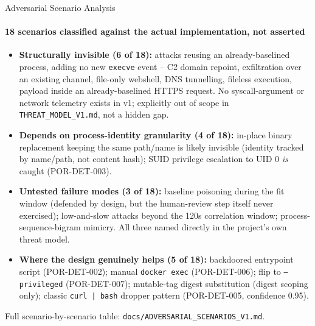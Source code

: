 \documentclass[aspectratio=169, 11pt]{beamer}
\begin{document}
\begin{frame}{Adversarial Scenario Analysis}
\framesubtitle{18 scenarios classified against the actual implementation, not asserted}
\scriptsize
\begin{itemize}
    \setlength{\itemsep}{3pt}
    \item \textbf{Structurally invisible (6 of 18):} attacks reusing an
    already-baselined process, adding no new \texttt{execve} event -- C2
    domain repoint, exfiltration over an existing channel, file-only
    webshell, DNS tunnelling, fileless execution, payload inside an
    already-baselined HTTPS request. No syscall-argument or network
    telemetry exists in v1; explicitly out of scope in
    \texttt{THREAT\_MODEL\_V1.md}, not a hidden gap.

    \item \textbf{Depends on process-identity granularity (4 of 18):}
    in-place binary replacement keeping the same path/name is likely
    invisible (identity tracked by name/path, not content hash); SUID
    privilege escalation to UID 0 \emph{is} caught (POR-DET-003).

    \item \textbf{Untested failure modes (3 of 18):} baseline poisoning
    during the fit window (defended by design, but the human-review step
    itself never exercised); low-and-slow attacks beyond the 120s
    correlation window; process-sequence-bigram mimicry. All three named
    directly in the project's own threat model.

    \item \textbf{Where the design genuinely helps (5 of 18):} backdoored
    entrypoint script (POR-DET-002); manual \texttt{docker exec}
    (POR-DET-006); flip to \texttt{--privileged} (POR-DET-007);
    mutable-tag digest substitution (digest scoping only); classic
    \texttt{curl | bash} dropper pattern (POR-DET-005, confidence 0.95).
\end{itemize}
Full scenario-by-scenario table: \texttt{docs/ADVERSARIAL\_SCENARIOS\_V1.md}.
\end{frame}
\end{document}
